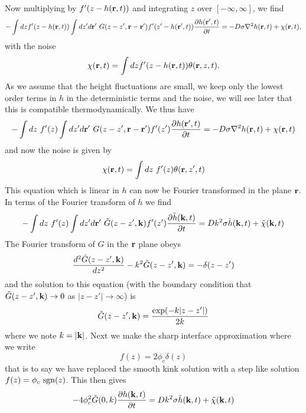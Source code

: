 Now multiplying by $f'(z-h({\bf r},t))$ and integrating $z$ over $[-\infty,\infty]$, we find
\begin{align}
-\int dz f'(z-h({\bf r},t))\int dz'd{\bf r}'\ G(z-z',{\bf r}-{\bf r}') f'(z'-h({\bf r}',t))\frac{\partial h({\bf r}',t)}{\partial t} = -D\sigma \nabla^2 h({\bf r},t) + \chi({\bf r},t),
\end{align}
with the noise
\begin{equation}
\chi({\bf r},t)= \int dz f'(z-h({\bf r},t)) \theta({\bf r},z,t).
\end{equation}
As we assume that the height fluctuations are small, we keep only the lowest order terms in $h$ in the deterministic terms and the noise, we will see later that this is compatible thermodynamically. We thus have
\begin{equation}
-\int dz \ f'(z)\int dz'd{\bf r}'\ G(z-z',{\bf r}-{\bf r}') f'(z')\frac{\partial h({\bf r}',t)}{\partial t} = -D\sigma \nabla^2 h({\bf r},t) + \chi({\bf r},t)
\end{equation}
and now the noise is given by
\begin{equation}
\chi({\bf r},t)= \int dz\ f'(z) \theta({\bf r},z',t)
\end{equation}
This equation which is linear in $h$ can now be Fourier transformed in the plane ${\bf r}$. In terms of the Fourier transform of $h$ we find
\begin{equation}
-\int dz \ f'(z)\int dz'd\br'\ \tilde G(z-z',\bk) f'(z')\frac{\partial\tilde h(\bk,t)}{\partial t} = Dk^2\sigma \tilde h(\bk,t) + \tilde \chi(\bk,t)
\label{bstep}
\end{equation}
The Fourier transform of $G$ in the ${\bf r}$ plane obeys
\begin{equation}
\frac{d^2 \tilde G(z-z',{\bf k} )}{dz^2}-k^2 \tilde G(z-z',{\bf k} )=-\delta(z-z')
\end{equation}
and the solution to this equation (with the boundary condition that $\tilde G(z-z',{\bf k} )\to 0$ as $|z-z'|\to\infty$) is
\begin{equation}
\tilde G(z-z',{\bf k}) = \frac{\exp(-k|z-z'|)}{2k}
\end{equation}
where we note $k=|{\bf k}|$. Next we make the sharp interface approximation where we write
\begin{equation}
f(z) = 2\phi_c \delta(z)
\label{sharp}
\end{equation}
that is to say we have replaced the smooth kink solution with a step like solution
$f(z) = \phi_c\ {\rm sgn}(z)$. This then gives
\begin{equation}
-4\phi_c^2 \tilde G(0,k) \frac{\partial h({\bf k},t)}{\partial t} = Dk^2\sigma \tilde h({\bf k},t) + \tilde \chi({\bf k},t)
\end{equation}
